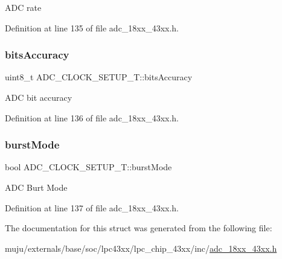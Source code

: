 A\+DC rate 

Definition at line 135 of file adc\+\_\+18xx\+\_\+43xx.\+h.

\mbox{\label{struct_a_d_c___c_l_o_c_k___s_e_t_u_p___t_aeb37891571691033d98087dabf6ddbd5}} 
\subsubsection{\texorpdfstring{bits\+Accuracy}{bitsAccuracy}}
{\footnotesize\ttfamily uint8\+\_\+t A\+D\+C\+\_\+\+C\+L\+O\+C\+K\+\_\+\+S\+E\+T\+U\+P\+\_\+\+T\+::bits\+Accuracy}

A\+DC bit accuracy 

Definition at line 136 of file adc\+\_\+18xx\+\_\+43xx.\+h.

\mbox{\label{struct_a_d_c___c_l_o_c_k___s_e_t_u_p___t_a92bc50d4472a36de38dac15a5fd3109a}} 
\subsubsection{\texorpdfstring{burst\+Mode}{burstMode}}
{\footnotesize\ttfamily bool A\+D\+C\+\_\+\+C\+L\+O\+C\+K\+\_\+\+S\+E\+T\+U\+P\+\_\+\+T\+::burst\+Mode}

A\+DC Burt Mode 

Definition at line 137 of file adc\+\_\+18xx\+\_\+43xx.\+h.



The documentation for this struct was generated from the following file\+:\begin{DoxyCompactItemize}
\item 
muju/externals/base/soc/lpc43xx/lpc\+\_\+chip\+\_\+43xx/inc/\hyperlink{adc__18xx__43xx_8h}{adc\+\_\+18xx\+\_\+43xx.\+h}\end{DoxyCompactItemize}
